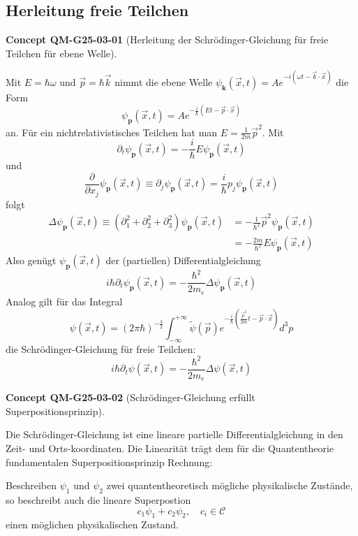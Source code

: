 \documentclass[10pt, letterpaper]{article}
\newcommand{\CustomHeading}[3]{%
  \par\medskip\noindent%
  \textbf{#1 #2} \textnormal{(#3)}.\enskip%
}
\newenvironment{CONC}[2]{\CustomHeading{Concept}{#1}{#2}}{}
\begin{document}
\subsection{Herleitung freie Teilchen}

\begin{CONC}{QM-G25-03-01}{Herleitung der Schrödinger-Gleichung für freie Teilchen für ebene Welle}
Mit $E=\hbar \omega$ und $\vec{p}=\hbar \vec{k}$ nimmt die ebene Welle $\psi_{\mathbf{k}}(\vec{x}, t)=A e^{-i(\omega t-\vec{k} \cdot \vec{x})}$ die Form
$$
\psi_{\mathbf{p}}(\vec{x}, t)=A e^{-\frac{i}{\hbar}(E t-\vec{p} \cdot \vec{x})}
$$
an. Für ein nichtrelativistisches Teilchen hat man $E=\frac{1}{2 m} \vec{p}^{2}$. Mit
$$
\partial_{t} \psi_{\mathbf{p}}(\vec{x}, t)=-\frac{i}{\hbar} E \psi_{\mathbf{p}}(\vec{x}, t)
$$
und
$$
\frac{\partial}{\partial x_{j}} \psi_{\mathbf{p}}(\vec{x}, t) \equiv \partial_{j} \psi_{\mathbf{p}}(\vec{x}, t)=\frac{i}{\hbar} p_{j} \psi_{\mathbf{p}}(\vec{x}, t)
$$
folgt
$$
\begin{aligned}
\Delta \psi_{\mathbf{p}}(\vec{x}, t) \equiv\left(\partial_{1}^{2}+\partial_{2}^{2}+\partial_{3}^{2}\right) \psi_{\mathbf{p}}(\vec{x}, t) & =-\frac{1}{\hbar^{2}} \vec{p}^{2} \psi_{\mathbf{p}}(\vec{x}, t) \\
& =-\frac{2 m}{\hbar^{2}} E \psi_{\mathbf{p}}(\vec{x}, t)
\end{aligned}
$$
Also genügt $\psi_{\mathbf{p}}(\vec{x}, t)$ der (partiellen) Differentialgleichung
$$
i \hbar \partial_{t} \psi_{\mathbf{p}}(\vec{x}, t)=-\frac{\hbar^{2}}{2 m_{e}} \Delta \psi_{\mathbf{p}}(\vec{x}, t)
$$
Analog gilt für das Integral
$$
\psi(\vec{x}, t)=(2 \pi \hbar)^{-\frac{3}{2}} \int_{-\infty}^{+\infty} \widetilde{\psi}(\vec{p}) e^{-\frac{i}{\hbar}\left(\frac{\vec{p}^{2}}{2 m} t-\vec{p} \cdot \vec{x}\right)} d^{3} p
$$
die Schrödinger-Gleichung für freie Teilchen:
$$
i \hbar \partial_{t} \psi(\vec{x}, t)=-\frac{\hbar^{2}}{2 m_{e}} \Delta \psi(\vec{x}, t)
$$
\end{CONC}

\begin{CONC}{QM-G25-03-02}{Schrödinger-Gleichung erfüllt Superpositionsprinzip}
Die Schrödinger-Gleichung ist eine lineare partielle Differentialgleichung in den Zeit- und Orts-koordinaten. Die Linearität trägt dem für die Quantentheorie fundamentalen Superpositionsprinzip Rechnung:

Beschreiben $\psi_{1}$ und $\psi_{2}$ zwei quantentheoretisch mögliche physikalische Zustände, so beschreibt auch die lineare Superpostion
$$
c_{1} \psi_{1}+c_{2} \psi_{2}, \quad c_{i} \in \mathcal{C}
$$
einen möglichen physikalischen Zustand.
\end{CONC}
\end{document}
